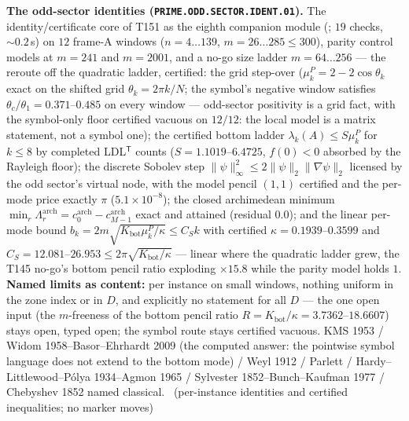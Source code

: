 \documentclass[11pt,a4paper]{article}
\theoremstyle{definition}
\begin{document}
\par\smallskip\noindent\textbf{The odd-sector identities
(\texttt{PRIME.ODD.SECTOR.IDENT.01}).}
The identity/certificate core of T151 as the eighth companion module
(; $19$ checks, ${\sim}0.2$\,s) on
$12$ frame-A windows ($n=4\ldots139$, $m=26\ldots285\le300$), parity
control models at $m=241$ and $m=2001$, and a no-go size ladder
$m=64\ldots256$ --- the reroute off the quadratic ladder, certified: the
grid step-over ($\mu^P_k=2-2\cos\theta_k$ exact on the shifted grid
$\theta_k=2\pi k/N$; the symbol's negative window satisfies
$\theta_c/\theta_1=0.371$--$0.485$ on every window --- odd-sector
positivity is a grid fact, with the symbol-only floor certified vacuous on
$12/12$: the local model is a matrix statement, not a symbol one); the
certified bottom ladder $\lambda_k(A)\le S\mu^P_k$ for $k\le8$ by completed
LDL$^{\mathsf T}$ counts ($S=1.1019$--$6.4725$, $f(0)<0$ absorbed by the
Rayleigh floor); the discrete Sobolev step
$\|\psi\|_\infty^2\le2\|\psi\|_2\|\nabla\psi\|_2$ licensed by the odd
sector's virtual node, with the model pencil $(1,1)$ certified and the
per-mode price exactly $\pi$ ($5.1\times10^{-8}$); the closed archimedean
minimum $\min_r\Lambda^{\mathrm{arch}}_r=c^{\mathrm{arch}}_0-
c^{\mathrm{arch}}_{M-1}$ exact and attained (residual $0.0$); and the
linear per-mode bound $b_k=2m\sqrt{K_{\mathrm{bot}}\mu^P_k/\kappa}\le C_Sk$
with certified $\kappa=0.1939$--$0.3599$ and
$C_S=12.081$--$26.953\le2\pi\sqrt{K_{\mathrm{bot}}/\kappa}$ --- linear
where the quadratic ladder grew, the T145 no-go's bottom pencil ratio
exploding $\times15.8$ while the parity model holds $1$.
\textbf{Named limits as content:} per instance on small windows, nothing
uniform in the zone index or in $D$, and explicitly no statement for all
$D$ --- the one open input (the $m$-freeness of the bottom pencil ratio
$R=K_{\mathrm{bot}}/\kappa=3.7362$--$18.6607$) stays open, typed open; the
symbol route stays certified vacuous. KMS 1953 / Widom
1958--Basor--Ehrhardt 2009 (the computed answer: the pointwise symbol
language does not extend to the bottom mode) / Weyl 1912 / Parlett /
Hardy--Littlewood--P\'olya 1934--Agmon 1965 / Sylvester
1852--Bunch--Kaufman 1977 / Chebyshev 1852 named classical.
\mE\ (per-instance identities and certified inequalities; no marker moves)
\par\smallskip
\end{document}
